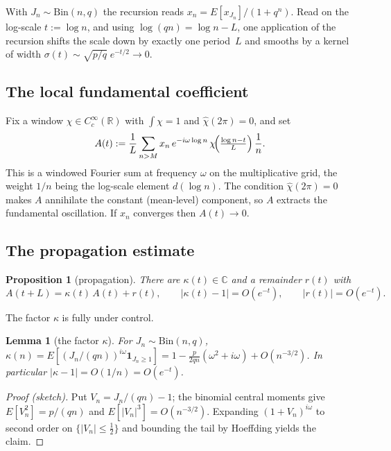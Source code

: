 \documentclass[11pt]{article}
\newtheorem{proposition}[theorem]{Proposition}
\newtheorem{lemma}[theorem]{Lemma}
\theoremstyle{definition}
\newcommand{\R}{\mathbb{R}}
\begin{document}
With $J_n\sim\mathrm{Bin}(n,q)$ the recursion reads
$x_n=E[x_{J_n}]/(1+q^n)$. Read on the log-scale $t:=\log n$, and using
$\log(qn)=\log n-L$, one application of the recursion shifts the scale
down by exactly one period~$L$ and smooths by a kernel of width
$\sigma(t)\sim\sqrt{p/q}\;e^{-t/2}\to0$.

\subsection{The local fundamental coefficient}

Fix a window $\chi\in C_c^\infty(\R)$ with $\int\chi=1$ and
$\hat\chi(2\pi)=0$, and set
\begin{equation}\label{eq:Adef}
  A(t):=\frac1L\sum_{n>M}x_n\,e^{-i\omega\log n}\,
        \chi\!\Bigl(\tfrac{\log n-t}{L}\Bigr)\,\frac1n .
\end{equation}
This is a windowed Fourier sum at frequency $\omega$ on the
multiplicative grid, the weight $1/n$ being the log-scale element
$d(\log n)$. The condition $\hat\chi(2\pi)=0$ makes $A$ annihilate the
constant (mean-level) component, so $A$ extracts the fundamental
oscillation. If $x_n$ converges then $A(t)\to0$.

\subsection{The propagation estimate}

\begin{proposition}[propagation]\label{prop:prop}
  There are $\kappa(t)\in\mathbb C$ and a remainder $r(t)$ with
  \[
    A(t+L)=\kappa(t)\,A(t)+r(t),\qquad
    |\kappa(t)-1|=O(e^{-t}),\qquad |r(t)|=O(e^{-t}).
  \]
\end{proposition}

The factor $\kappa$ is fully under control.

\begin{lemma}[the factor $\kappa$]\label{lem:kappa}
  For $J_n\sim\mathrm{Bin}(n,q)$,
  $\kappa(n)=E[(J_n/(qn))^{i\omega}\mathbf 1_{J_n\ge1}]
  =1-\tfrac{p}{2qn}(\omega^2+i\omega)+O(n^{-3/2})$. In particular
  $|\kappa-1|=O(1/n)=O(e^{-t})$.
\end{lemma}

\begin{proof}[Proof (sketch)]
  Put $V_n=J_n/(qn)-1$; the binomial central moments give
  $E[V_n^2]=p/(qn)$ and $E[|V_n|^3]=O(n^{-3/2})$. Expanding
  $(1+V_n)^{i\omega}$ to second order on $\{|V_n|\le\tfrac12\}$ and
  bounding the tail by Hoeffding yields the claim.
\end{proof}
\end{document}
